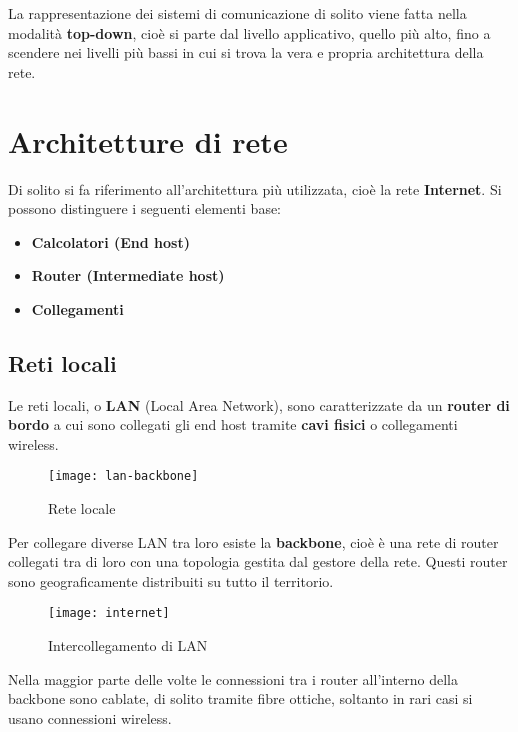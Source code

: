 \documentclass[a4paper]{article}
\begin{document}
\noindent
La rappresentazione dei sistemi di comunicazione di solito viene fatta nella modalità
\textbf{top-down}, cioè si parte dal livello applicativo, quello più alto, fino a scendere
nei livelli più bassi in cui si trova la vera e propria architettura della rete.

\section{Architetture di rete}
Di solito si fa riferimento all'architettura più utilizzata, cioè la rete
\textbf{Internet}. Si possono distinguere i seguenti elementi base:
\begin{itemize}
  \item \textbf{Calcolatori (End host)}
  \item \textbf{Router (Intermediate host)}
  \item \textbf{Collegamenti}
\end{itemize}

\subsection{Reti locali}
Le reti locali, o \textbf{LAN} (Local Area Network), sono caratterizzate da un
\textbf{router di bordo} a cui sono collegati gli end host tramite \textbf{cavi fisici}
o collegamenti wireless.
\begin{figure}[H]
  \centering
  \texttt{[image: lan-backbone]}
  \caption{Rete locale}
\end{figure}

\vspace{1em}
\noindent
Per collegare diverse LAN tra loro esiste la \textbf{backbone}, cioè è una rete
di router collegati tra di loro con una topologia
gestita dal gestore della rete. Questi router sono geograficamente distribuiti
su tutto il territorio.
\begin{figure}[H]
  \centering
  \texttt{[image: internet]}
  \caption{Intercollegamento di LAN}
\end{figure}

\noindent
Nella maggior parte delle volte le connessioni tra i router all'interno della
backbone sono cablate, di solito tramite fibre ottiche, soltanto in rari casi
si usano connessioni wireless.
\end{document}
